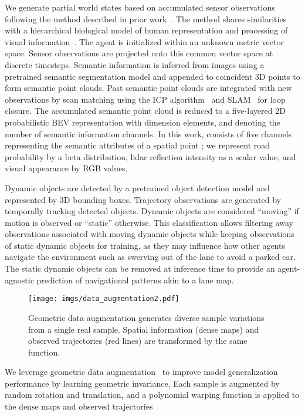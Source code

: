 \documentclass[letterpaper, 10 pt, conference]{ieeeconf}
\begin{document}
We generate partial world states based on accumulated sensor observations following the method described in prior work~\cite{karlsson2023pred_wm}. The method shares similarities with a hierarchical biological model of human representation and processing of visual information~\cite{mar1982human_hierarchical_vision_repr}.
The agent is initialized within an unknown metric vector space. Sensor observations are projected onto this common vector space at discrete timesteps. Semantic information is inferred from images using a pretrained semantic segmentation model and appended to coincident 3D points to form semantic point clouds.
Past semantic point clouds are integrated with new observations by scan matching using the ICP algorithm~\cite{vizzo2022kiss-icp} and SLAM~\cite{smith1986slam} for loop closure. The accumulated semantic point cloud is reduced to a five-layered 2D probabilistic BEV representation  with dimension  elements, and  denoting the number of semantic information channels. In this work,  consists of five channels representing the semantic attributes of a spatial point ; we represent road probability  by a beta distribution, lidar reflection intensity  as a scalar value, and visual appearance by RGB values.


Dynamic objects are detected by a pretrained object detection model and represented by 3D bounding boxes. Trajectory observations are generated by temporally tracking detected objects. 
Dynamic objects are considered ``moving'' if motion is observed or ``static'' otherwise. This classification allows filtering away observations associated with moving dynamic objects while keeping observations of static dynamic objects for training, as they may influence how other agents navigate the environment such as swerving out of the lane to avoid a parked car. The static dynamic objects can be removed at inference time to provide an agent-agnostic prediction of navigational patterns akin to a lane map.

\begin{figure}\centering
\texttt{[image: imgs/data\_augmentation2.pdf]}
\vspace{-8mm}
\caption{Geometric data augmentation generates diverse sample variations from a single real sample. Spatial information (dense maps) and observed trajectories (red lines) are transformed by the same function.}
\label{fig:data_aug}
\vspace{-5mm}
\end{figure}

We leverage geometric data augmentation~\cite{karlsson2020dsla} to improve model generalization performance by learning geometric invariance. Each sample is augmented by random rotation and translation, and a polynomial warping function is applied to the dense maps and observed trajectories
\end{document}
